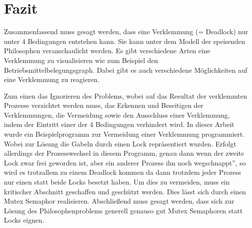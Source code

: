 \chapter{Fazit}
\label{fazit}

Zusammenfassend muss gesagt werden, dass eine Verklemmung (= Deadlock) nur unter 4 Bedingungen entstehen kann. Sie kann unter dem Modell der speisenden Philosophen veranschaulicht werden. Es gibt verschiedene Arten eine Verklemmung zu visualisieren wie zum Beispiel den Betriebsmittelbelegungsgraph. Dabei gibt es auch verschiedene Möglichkeiten auf eine Verklemmung zu reagieren. 

Zum einen das Ignorieren des Problems, wobei auf das Resultat der verklemmten Prozesse verzichtet werden muss, das Erkennen und Beseitigen der Verklemmungen, die Vermeidung sowie den Ausschluss einer Verklemmung, indem der Eintritt einer der 4 Bedingungen verhindert wird.
In dieser Arbeit wurde ein Beispielprogramm zur Vermeidung einer Verklemmung programmiert. Wobei zur Lösung die Gabeln durch einen Lock repräsentiert wurden. Erfolgt allerdings der Prozesswechsel in diesem Programm, genau dann wenn der zweite Lock zwar frei geworden ist, aber ein anderer Prozess ihn noch \glqq wegschnappt'', so wird es trotzallem zu einem Deadlock kommen da dann trotzdem jeder Prozess nur einen statt beide Locks besetzt haben. Um dies zu vermeiden, muss ein kritischer Abschnitt geschaffen und geschützt werden. Dies lässt sich durch einen Mutex Semaphor realisieren.
Abschließend muss gesagt werden, dass sich zur Lösung des Philosophenproblems generell genauso gut Mutex Semaphoren statt Locks eignen.